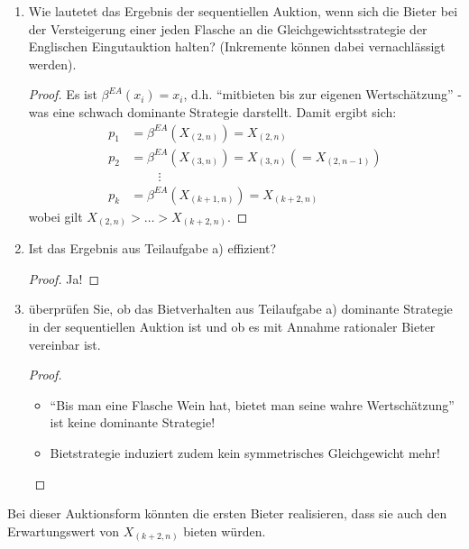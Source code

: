 \documentclass[12pt]{extreport} %
\theoremstyle{named}
\theoremstyle{nnamed}
\theoremstyle{itshape}
\theoremstyle{normal}
\begin{document}
\begin{enumerate}
	\item Wie lautetet das Ergebnis der sequentiellen Auktion, wenn sich die Bieter bei der Versteigerung einer jeden Flasche an die Gleichgewichtsstrategie der Englischen Eingutauktion halten? (Inkremente können dabei vernachlässigt werden).
		\begin{proof}
			Es ist $\beta^{EA}(x_i) = x_i$, d.h. \enquote{mitbieten bis zur eigenen Wertschätzung} - was eine schwach dominante Strategie darstellt. Damit ergibt sich:
			\begin{align*}
				p_1 & = \beta^{EA}\left( X_{(2,n)} \right) = X_{(2,n)} \\
				p_2 & = \beta^{EA}\left( X_{(3,n)} \right) = X_{(3,n)} \left( = X_{(2,n-1)} \right) \\
				& ~\qquad \vdots \\
				p_k & = \beta^{EA}\left( X_{(k+1, n)} \right) = X_{(k+2,n)}
			\end{align*}
			wobei gilt $X_{(2,n)} > \dotsc > X_{(k+2,n)}$.
		\end{proof}
	\item Ist das Ergebnis aus Teilaufgabe a) effizient?
		\begin{proof}
			Ja!
		\end{proof}
	\item überprüfen Sie, ob das Bietverhalten aus Teilaufgabe a) dominante Strategie in der sequentiellen Auktion ist und ob es mit Annahme rationaler Bieter vereinbar ist.
		\begin{proof} ~\
			\begin{itemize}
				\item \enquote{Bis man eine Flasche Wein hat, bietet man seine wahre Wertschätzung} ist keine dominante Strategie!
				\item Bietstrategie induziert zudem kein symmetrisches Gleichgewicht mehr!
			\end{itemize}
		\end{proof}
\end{enumerate}

Bei dieser Auktionsform könnten die ersten Bieter realisieren, dass sie auch den Erwartungswert von $X_{(k+2,n)}$ bieten würden.

\printindex
\end{document}
